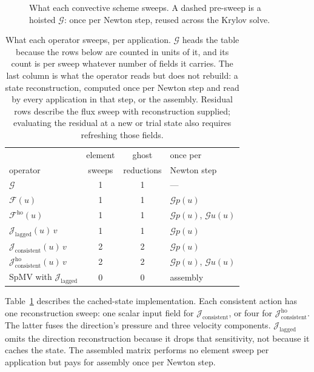 \documentclass[sigconf,nonacm]{acmart}
\newcommand{\Gop}{\mathcal{G}}
\newcommand{\Fres}{\mathcal{F}}
\newcommand{\Fho}{\mathcal{F}^{\mathrm{ho}}}
\newcommand{\Jlag}{\mathcal{J}_{\mathrm{lagged}}}
\newcommand{\Jex}{\mathcal{J}_{\mathrm{consistent}}}
\newcommand{\Jhoex}{\mathcal{J}^{\mathrm{ho}}_{\mathrm{consistent}}}
\begin{document}
\begin{figure}[t]
  \centering
  \resizebox{\columnwidth}{!}{}
  \caption{What each convective scheme sweeps. A dashed pre-sweep is a hoisted $\Gop$: once per
    Newton step, reused across the Krylov solve.}
  \label{fig:schemes}
\end{figure}

\begin{table}[t]
  \centering
  \caption{What each operator sweeps, per application. $\Gop$ heads the table because the rows
    below are counted in units of it, and its count is per sweep whatever number of fields it
    carries. The last column is what the operator reads but does not rebuild: a state
    reconstruction, computed once per Newton step and read by every application in that step, or
    the assembly. Residual rows describe the flux sweep with reconstruction supplied;
    evaluating the residual at a new or trial state also requires refreshing those fields.}
  \label{tab:passes}
  \small
  \begin{tabular}{@{}lccl@{}}
    \toprule
    & element & ghost & once per \\
    operator & sweeps & reductions & Newton step \\
    \midrule
    $\Gop$                            & 1 & 1 & --- \\
    \addlinespace
    $\Fres(u)$                        & 1 & 1 & $\Gop p(u)$ \\
    $\Fho(u)$                         & 1 & 1 & $\Gop p(u)$, $\Gop u(u)$ \\
    $\Jlag(u)\,v$                     & 1 & 1 & $\Gop p(u)$ \\
    $\Jex(u)\,v$                      & 2 & 2 & $\Gop p(u)$ \\
    $\Jhoex(u)\,v$                    & 2 & 2 & $\Gop p(u)$, $\Gop u(u)$ \\
    SpMV with $\Jlag$                 & 0 & 0 & assembly \\
    \bottomrule
  \end{tabular}
\end{table}

Table~\ref{tab:passes} describes the cached-state implementation. Each consistent action has one
reconstruction sweep: one scalar input field for $\Jex$, or four for $\Jhoex$. The latter
fuses the direction's pressure and three velocity components. $\Jlag$ omits the direction
reconstruction because it drops that sensitivity, not because it caches the state.
The assembled matrix performs no element sweep per application but pays for assembly once
per Newton step.
\end{document}
